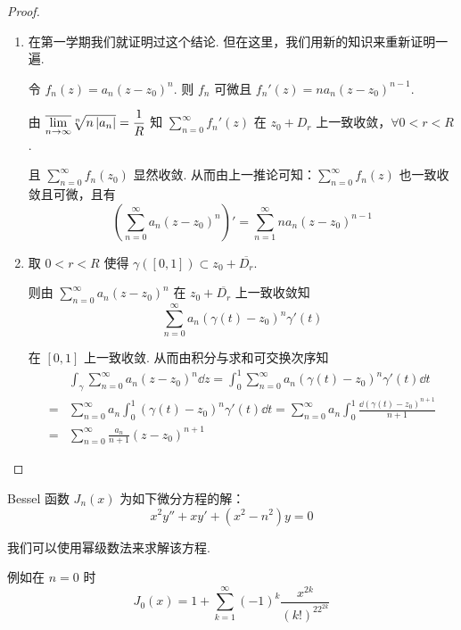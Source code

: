 \begin{proof}
    \begin{enumerate}
        \item 在第一学期我们就证明过这个结论. 但在这里，我们用新的知识来重新证明一遍.
        
        令 $f_n(z)=a_n(z-z_0)^n$. 则 $f_n$ 可微且 $f_n'(z)=na_n(z-z_0)^{n-1}$.

        由 $\overline{\lim\limits_{n\to\infty}}\sqrt[n]{n\left\lvert{a_n}\right\rvert}=\dfrac{1}{R}$ 知 $\sum\limits_{n=0}^\infty f_n'(z)$ 在 $z_0+D_r$ 上一致收敛，$\forall 0<r<R$.

        且 $\sum\limits_{n=0}^\infty f_n(z_0)$ 显然收敛. 从而由上一推论可知：$\sum\limits_{n=0}^\infty f_n(z)$ 也一致收敛且可微，且有
$$
\left(\sum_{n=0}^\infty a_n(z-z_0)^n\right)'=\sum_{n=1}^\infty na_n(z-z_0)^{n-1}
$$

        \item 取 $0<r<R$ 使得 $\gamma([0,1])\subset z_0+\overline{D_r}$.
        
        则由 $\sum\limits_{n=0}^\infty a_n(z-z_0)^n$ 在 $z_0+\overline{D_r}$ 上一致收敛知
$$
\sum\limits_{n=0}^\infty a_n(\gamma(t)-z_0)^n\gamma'(t)
$$

        在 $[0,1]$ 上一致收敛. 从而由积分与求和可交换次序知
$$
\begin{aligned}
    &\int_\gamma\sum\limits_{n=0}^\infty a_n(z-z_0)^n\dd z=\int_0^1\sum\limits_{n=0}^\infty a_n(\gamma(t)-z_0)^n\gamma'(t)\dd t\\
    =&\sum\limits_{n=0}^\infty a_n\int_0^1(\gamma(t)-z_0)^n\gamma'(t)\dd t=\sum_{n=0}^\infty a_n\int_0^1\frac{\dd(\gamma(t)-z_0)^{n+1}}{n+1}\\
    =&\sum\limits_{n=0}^\infty \frac{a_n}{n+1}(z-z_0)^{n+1}
\end{aligned}
$$
    \end{enumerate}
\end{proof}

\begin{example}
    Bessel 函数 $J_n(x)$ 为如下微分方程的解：
$$
x^2y''+xy'+(x^2-n^2)y=0
$$

    我们可以使用幂级数法来求解该方程.

    例如在 $n=0$ 时
$$
J_0(x)=1+\sum\limits_{k=1}^\infty(-1)^k\frac{x^{2k}}{(k!)^22^{2k}}
$$
\end{example}
